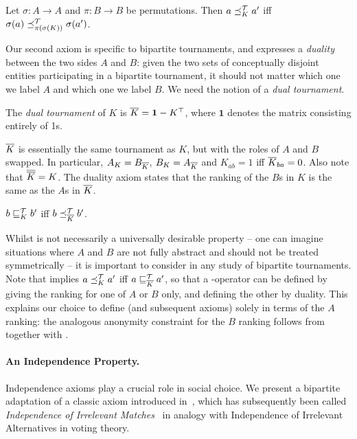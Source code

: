 \begin{axiom}[\anon{}]
    Let $\sigma:A \to A$ and $\pi:B \to B$ be permutations. Then $a \preceq_K^{\mathcal{T}}
    a'$ iff $\sigma(a) \preceq_{\pi(\sigma(K))}^{\mathcal{T}} \sigma(a')$.
\end{axiom}

Our second axiom is specific to bipartite tournaments, and expresses a
\emph{duality} between the two sides $A$ and $B$: given the two sets of
conceptually disjoint entities participating in a bipartite tournament, it
should not matter which one we label $A$ and which one we label $B$. We need
the notion of a \emph{dual tournament}.

\begin{definition}%

    The \emph{dual tournament} of $K$ is ${\overline{K}} = \bm{1} - K^\top$, where
    $\bm{1}$ denotes the matrix consisting entirely of 1s.

\end{definition}

${\overline{K}}$ is essentially the same tournament as $K$, but with the roles of $A$
and $B$ swapped. In particular, $A_K = B_{\overline{K}}$, $B_K = A_{\overline{K}}$ and
$K_{ab} = 1$ iff ${\overline{K}}_{ba} = 0$. Also note that ${\overline{{\overline{K}}}} = K$.
The duality axiom states that the ranking of the $B$s in $K$ is the same as the
$A$s in ${\overline{K}}$.

\begin{axiom}[\dualaxiom{}]
    $b \sqsubseteq_K^{\mathcal{T}} b'$ iff $b \preceq_{\overline{K}}^{\mathcal{T}} b'$.
\end{axiom}

Whilst \dualaxiom{} is not necessarily a universally desirable property --
one can imagine situations where $A$ and $B$ are not fully abstract and should
not be treated symmetrically -- it is important to consider in any study of
bipartite tournaments. Note that \dualaxiom{} implies $a \preceq_K^{\mathcal{T}}
a'$ iff $a \sqsubseteq_{{\overline{K}}}^{\mathcal{T}} a'$, so that a \dualaxiom{}-operator can be
defined by giving the ranking for one of $A$ or $B$ only, and defining the
other by duality. This explains our choice to define \anon{} (and
subsequent axioms) solely in terms of the $A$ ranking: the analogous anonymity
constraint for the $B$ ranking follows from \anon{} together with
\dualaxiom{}.

\paragraph{An Independence Property.}
%
Independence axioms play a crucial role in social choice. We present a
bipartite adaptation of a classic axiom introduced
in~\cite{rubinstein1980ranking}, which has subsequently been called
\emph{Independence of Irrelevant Matches}~\cite{gonzalez2014paired} in analogy
with Independence of Irrelevant Alternatives in voting theory.

